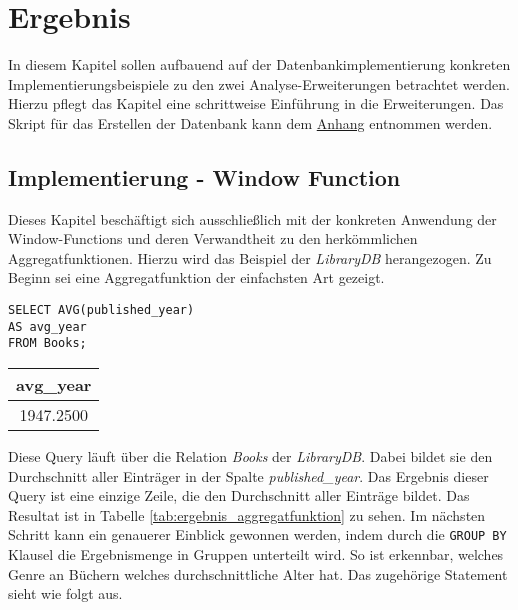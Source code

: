 \chapter{Ergebnis}
\label{chap:ergebnis} In diesem Kapitel sollen aufbauend auf der Datenbankimplementierung
konkreten Implementierungsbeispiele zu den zwei Analyse-Erweiterungen betrachtet
werden. Hierzu pflegt das Kapitel eine schrittweise Einführung in die Erweiterungen. Das
Skript für das Erstellen der Datenbank kann dem \hyperref[sec:library_db]{Anhang} entnommen werden.

\section{Implementierung - Window Function}
\label{sec:window_function} Dieses Kapitel beschäftigt sich ausschließlich mit der
konkreten Anwendung der Window-Functions und deren Verwandtheit zu den herkömmlichen
Aggregatfunktionen. Hierzu wird das Beispiel der \textit{LibraryDB} herangezogen.
Zu Beginn sei eine Aggregatfunktion der einfachsten Art gezeigt.

\begin{minipage}{0.55\textwidth}
	 \begin{lstlisting}
SELECT AVG(published_year)
AS avg_year
FROM Books;
	\end{lstlisting}
\end{minipage}
\hfill
\begin{minipage}{0.45\textwidth}
	\centering
	\begin{tabular}{|c|}
		\hline
		\textbf{avg\_year} \\
		\hline
		1947.2500          \\
		\hline
	\end{tabular}
	 \label{tab:ergebnis_aggregatfunktion}
\end{minipage}

Diese Query läuft über die Relation \textit{Books} der \textit{LibraryDB}. Dabei
bildet sie den Durchschnitt aller Einträger in der Spalte \textit{published\_year}.
Das Ergebnis dieser Query ist eine einzige Zeile, die den Durchschnitt aller Einträge
bildet. Das Resultat ist in Tabelle \ref{tab:ergebnis_aggregatfunktion} zu sehen.
Im nächsten Schritt kann ein genauerer Einblick gewonnen werden, indem durch die
\texttt{GROUP BY} Klausel die Ergebnismenge in Gruppen unterteilt wird. So ist
erkennbar, welches Genre an Büchern welches durchschnittliche Alter hat. Das
zugehörige Statement sieht wie folgt aus.

